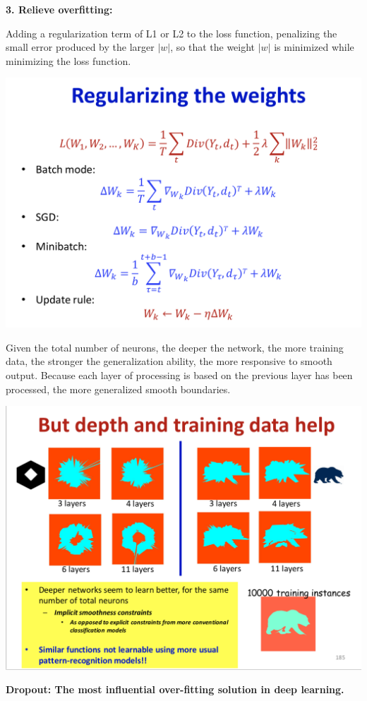 \documentclass{article}
\begin{document}
	\textbf{3. Relieve overfitting:}
	
	Adding a regularization term of L1 or L2 to the loss function, penalizing the small error produced by the larger $|w|$, so that the weight $|w|$ is minimized while minimizing the loss function.
	
	\includegraphics[scale=0.2]{99.png}
	
	Given the total number of neurons, the deeper the network, the more training data, the stronger the generalization ability, the more responsive to smooth output. Because each layer of processing is based on the previous layer has been processed, the more generalized smooth boundaries.
	
	\includegraphics[scale=0.2]{100.png}
	
	\textbf{Dropout: The most influential over-fitting solution in deep learning.}
	
\end{document}
